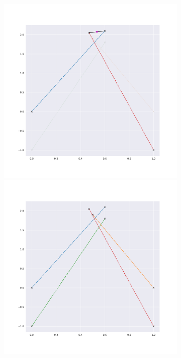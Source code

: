 \begin{figure}
\begin{subfigure}{0.23\textwidth}
        \includegraphics[width=0.9\linewidth]{Plots/stereo_magic_3.pdf} 
        \includegraphics[width=0.9\linewidth]{Plots/stereo_magic_all.pdf} 
    \end{subfigure}
    \begin{subfigure}{0.23\textwidth}

\end{subfigure}
\end{figure}
